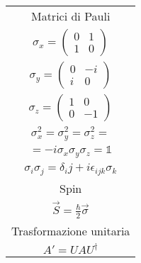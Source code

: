 \documentclass{article}
\newcommand{\id}{
    \mathds{1}
}
\begin{document}
\begin{minipage}{0.173\linewidth}
    \begin{tabular}{|c}
        Matrici di Pauli \\
        $\sigma_x = \left(\begin{matrix}
            0 & 1 \\
            1 & 0
        \end{matrix}\right) $ \\
        $\sigma_y = \left(\begin{matrix}
            0 & -i \\
            i & 0
        \end{matrix}\right) $ \\
        $\sigma_z = \left(\begin{matrix}
            1 & 0 \\
            0 & -1
        \end{matrix}\right) $ \\ 
        $\sigma_x^2 = \sigma_y^2 = \sigma_z^2 = $ \\
        $= -i\sigma_x\sigma_y\sigma_z = \id $ \\
        $\sigma_i\sigma_j = \delta_ij + i\epsilon_{ijk}\sigma_k $ \\ \hline
        Spin \\
        $\Vec{S} = \frac{\hbar}{2}\Vec{\sigma} $ \\ \hline
        Trasformazione unitaria \\
        $A' = UAU^\dagger $ \\ \hline
    \end{tabular}
\end{minipage}
\end{document}
